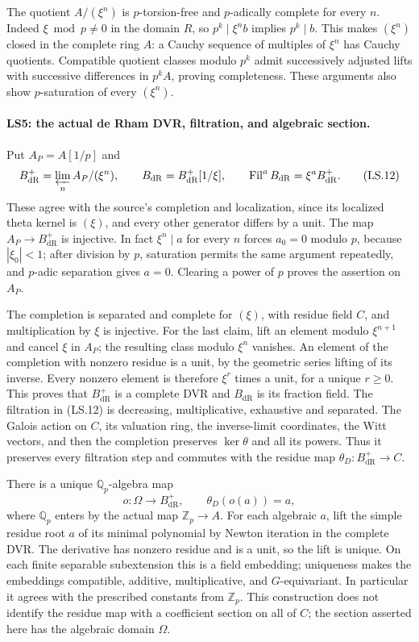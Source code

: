 The quotient $A/(\xi^n)$ is $p$-torsion-free and $p$-adically
complete for every $n$. Indeed $\xi\bmod p\ne0$ in the domain
$R$, so $p^k\mid\xi^n b$ implies $p^k\mid b$. This makes
$(\xi^n)$ closed in the complete ring $A$: a Cauchy sequence of
multiples of $\xi^n$ has Cauchy quotients. Compatible quotient
classes modulo $p^k$ admit successively adjusted lifts with
successive differences in $p^kA$, proving completeness. These
arguments also show $p$-saturation of every $(\xi^n)$.

\paragraph{LS5: the actual de Rham DVR, filtration, and algebraic section.}
Put $A_P=A[1/p]$ and
\[
 B_{\mathrm{dR}}^+=\varprojlim_n A_P/(\xi^n),\qquad
 B_{\mathrm{dR}}=B_{\mathrm{dR}}^+[1/\xi],\qquad
 \operatorname{Fil}^aB_{\mathrm{dR}}=\xi^aB_{\mathrm{dR}}^+.
 \tag{LS.12}
\]
These agree with the source's completion and localization, since its
localized theta kernel is $(\xi)$, and every other generator differs
by a unit. The map $A_P\to B_{\mathrm{dR}}^+$ is injective.
In fact $\xi^n\mid a$ for every $n$ forces $a_0=0$ modulo $p$,
because $|\xi_0|<1$; after division by $p$, saturation permits the
same argument repeatedly, and $p$-adic separation gives $a=0$.
Clearing a power of $p$ proves the assertion on $A_P$.

The completion is separated and complete for $(\xi)$, with residue
field $C$, and multiplication by $\xi$ is injective. For the last
claim, lift an element modulo $\xi^{n+1}$ and cancel $\xi$ in
$A_P$; the resulting class modulo $\xi^n$ vanishes. An element of
the completion with nonzero residue is a unit, by the geometric
series lifting of its inverse. Every nonzero element is therefore
$\xi^r$ times a unit, for a unique $r\ge0$. This proves that
$B_{\mathrm{dR}}^+$ is a complete DVR and $B_{\mathrm{dR}}$ is its
fraction field. The filtration in (LS.12) is decreasing,
multiplicative, exhaustive and separated. The Galois action on
$C$, its valuation ring, the inverse-limit coordinates, the Witt
vectors, and then the completion preserves $\ker\theta$ and all
its powers. Thus it preserves every filtration step and commutes
with the residue map $\theta_D:B_{\mathrm{dR}}^+\to C$.

There is a unique $\mathbb Q_p$-algebra map
\[
 o:\Omega\longrightarrow B_{\mathrm{dR}}^+,
 \qquad\theta_D(o(a))=a,                            \tag{LS.13}
\]
where $\mathbb Q_p$ enters by the actual map $\mathbb Z_p\to A$.
For each algebraic $a$, lift the simple residue root $a$ of its
minimal polynomial by Newton iteration in the complete DVR.
The derivative has nonzero residue and is a unit, so the lift is
unique. On each finite separable subextension this is a field
embedding; uniqueness makes the embeddings compatible, additive,
multiplicative, and $G$-equivariant. In particular it agrees with
the prescribed constants from $\mathbb Z_p$. This construction does
not identify the residue map with a coefficient section on all of
$C$; the section asserted here has the algebraic domain $\Omega$.

